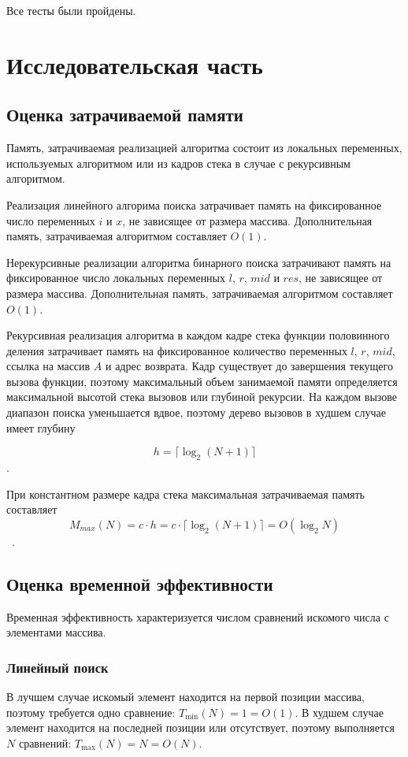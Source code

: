 \documentclass{bmstu}
\begin{document}
Все тесты были пройдены.

\chapter{Исследовательская часть}

\section{Оценка затрачиваемой памяти}
Память, затрачиваемая реализацией алгоритма состоит из локальных переменных,
используемых алгоритмом или из кадров стека в случае с рекурсивным алгоритмом.

Реализация линейного алгорима поиска затрачивает память на фиксированное число переменных $i$ и
$x$, не зависящее от размера массива. Дополнительная память, затрачиваемая
алгоритмом составляет $O(1)$.

Нерекурсивные реализации алгоритма бинарного поиска затрачивают память на фиксированное
число локальных переменных $l$, $r$, $mid$ и $res$, не зависящее от размера
массива. Дополнительная память, затрачиваемая алгоритмом составляет $O(1)$.

Рекурсивная реализация алгоритма в каждом кадре стека функции половинного
деления затрачивает память на фиксированное количество переменных $l$, $r$,
$mid$, ссылка на массив $A$ и адрес возврата. Кадр существует до завершения
текущего вызова функции, поэтому максимальный объем занимаемой памяти
определяется максимальной высотой стека вызовов или глубиной рекурсии. На каждом
вызове диапазон поиска уменьшается вдвое, поэтому дерево вызовов в худшем случае имеет глубину

$$h = \lceil\log_2(N + 1)\rceil$$.

При константном размере кадра стека максимальная затрачиваемая память составляет
$$M_{max}(N) = c \cdot h = c \cdot \lceil\log_2(N + 1)\rceil = O(\log_2N)$$~.

\section{Оценка временной эффективности}
Временная эффективность характеризуется числом сравнений искомого числа с
элементами массива.
\subsection{Линейный поиск}
В лучшем случае искомый элемент находится на первой позиции массива, поэтому
требуется одно сравнение: $T_{\min}(N)=1=O(1)$. В худшем случае элемент
находится на последней позиции или отсутствует, поэтому выполняется $N$
сравнений: $T_{\max}(N)=N=O(N)$.
\end{document}
